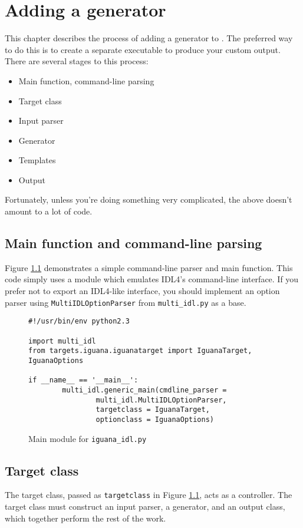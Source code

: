 \chapter{Adding a generator}
This chapter describes the process of adding a generator to \magpie. The preferred way to do this is to create a separate executable to produce your custom output. There are several stages to this process:
\begin{itemize}
\item Main function, command-line parsing
\item Target class
\item Input parser
\item Generator
\item Templates
\item Output
\end{itemize}

Fortunately, unless you're doing something very complicated, the above doesn't amount to a lot of code.

\section{Main function and command-line parsing}
Figure \ref{fig:code:iguanaidl} demonstrates a simple command-line parser and main function. This code simply uses a module which emulates IDL4's command-line interface. If you prefer not to export an IDL4-like interface, you should implement an option parser using {\tt MultiIDLOptionParser} from {\tt multi\_idl.py} as a base.

\begin{figure}
\begin{verbatim}
#!/usr/bin/env python2.3

import multi_idl
from targets.iguana.iguanatarget import IguanaTarget, IguanaOptions

if __name__ == '__main__':
        multi_idl.generic_main(cmdline_parser =
				multi_idl.MultiIDLOptionParser,
                targetclass = IguanaTarget,
                optionclass = IguanaOptions)
\end{verbatim}
\caption{Main module for {\tt iguana\_idl.py}}
\label{fig:code:iguanaidl}
\end{figure}

\section{Target class}
The target class, passed as {\tt targetclass} in Figure \ref{fig:code:iguanaidl}, acts as a controller. The target class must construct an input parser, a generator, and an output class, which together perform the rest of the work.

